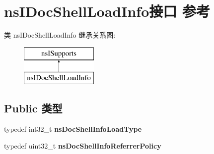 \hypertarget{interfacens_i_doc_shell_load_info}{}\section{ns\+I\+Doc\+Shell\+Load\+Info接口 参考}
\label{interfacens_i_doc_shell_load_info}
类 ns\+I\+Doc\+Shell\+Load\+Info 继承关系图\+:\begin{figure}[H]
\begin{center}
\leavevmode
\includegraphics[height=2.000000cm]{interfacens_i_doc_shell_load_info}
\end{center}
\end{figure}
\subsection*{Public 类型}
\begin{DoxyCompactItemize}
\item 
\mbox{\label{interfacens_i_doc_shell_load_info_a0084fd17d2d87138af56d3c3a89a7543}} 
typedef int32\+\_\+t {\bfseries ns\+Doc\+Shell\+Info\+Load\+Type}
\item 
\mbox{\label{interfacens_i_doc_shell_load_info_a79be49e4c210eef2cad2c788a88bf610}} 
typedef uint32\+\_\+t {\bfseries ns\+Doc\+Shell\+Info\+Referrer\+Policy}
\end{DoxyCompactItemize}
